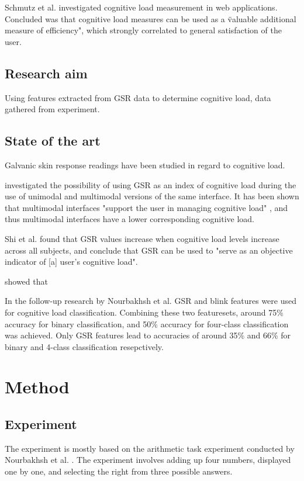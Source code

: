 \documentclass[12pt,leqno,letterpaper]{report} %
\begin{document}
Schmutz et al. \citep{Schmutz2009} investigated cognitive load measurement in web applications. Concluded was that cognitive load measures can be used as a \"valuable additional measure of efficiency", which strongly correlated to general satisfaction of the user. 



\section{Research aim}
Using features extracted from GSR data to determine cognitive load, data gathered from experiment.

\section{State of the art}
Galvanic skin response readings have been studied in regard to cognitive load.

\citep{Shi2007} investigated the possibility of using GSR as an index of cognitive load during the use of unimodal and multimodal versions of the same interface. It has been shown that multimodal interfaces "support the user in managing cognitive load" \citep{Oviatt2004}, and thus multimodal interfaces have a lower corresponding cognitive load. 

Shi et al. found that GSR values increase when cognitive load levels increase across all subjects, and conclude that GSR can be used to "serve as an objective indicator of [a] user's cognitive load".

\citep{Nourbakhsh2012} showed that 

In the follow-up research by Nourbakhsh et al. \citep{Nourbakhsh2013} GSR and blink features were used for cognitive load classification. Combining these two featuresets, around 75\% accuracy for binary classification, and 50\% accuracy for four-class classification was achieved. Only GSR features lead to accuracies of around 35\% and 66\% for binary and 4-class classification resepctively.



\chapter{Method}

\section{Experiment}
The experiment is mostly based on the arithmetic task experiment conducted by Nourbakhsh et al. \citep{Nourbakhsh2012}. The experiment involves adding up four numbers, displayed one by one, and selecting the right from three possible answers.
\end{document}

